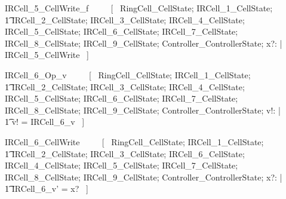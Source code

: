 \documentclass{article}
\begin{document}
\begin{zed}
IRCell\_5\_CellWrite\_f ~~~~ [~ 
    \Xi RingCell\_CellState; 
    \Xi IRCell\_1\_CellState; \\
    \t1 \Xi IRCell\_2\_CellState; 
    \Xi IRCell\_3\_CellState;
    \Xi IRCell\_4\_CellState; 
    \Xi IRCell\_5\_CellState; 
    \Xi IRCell\_6\_CellState; 
    \Xi IRCell\_7\_CellState; 
    \Xi IRCell\_8\_CellState; 
    \Xi IRCell\_9\_CellState; 
    \Xi Controller\_ControllerState; 
    x?: \nat | \\
    \lnot \pre IRCell\_5\_CellWrite ~] \\
\end{zed}
\begin{zed}
IRCell\_6\_Op\_v ~~~~ [~ 
    \Xi RingCell\_CellState; 
    \Xi IRCell\_1\_CellState; \\
    \t1 \Xi IRCell\_2\_CellState; 
    \Xi IRCell\_3\_CellState;
    \Xi IRCell\_4\_CellState; 
    \Xi IRCell\_5\_CellState; 
    \Xi IRCell\_6\_CellState; 
    \Xi IRCell\_7\_CellState; 
    \Xi IRCell\_8\_CellState; 
    \Xi IRCell\_9\_CellState; 
    \Xi Controller\_ControllerState; v!: \nat | \\
    \t1 v! = IRCell\_6\_v ~] \\
\end{zed}

\begin{zed}
IRCell\_6\_CellWrite ~~~~ [~ 
    \Xi RingCell\_CellState; 
    \Xi IRCell\_1\_CellState; \\
    \t1 \Xi IRCell\_2\_CellState; 
    \Xi IRCell\_3\_CellState; 
    \Delta IRCell\_6\_CellState;
    \Xi IRCell\_4\_CellState; 
    \Xi IRCell\_5\_CellState; 
    \Xi IRCell\_7\_CellState; 
    \Xi IRCell\_8\_CellState; 
    \Xi IRCell\_9\_CellState; 
    \Xi Controller\_ControllerState; 
    x?: \nat | \\
    \t1 IRCell\_6\_v' = x? ~] \\
\end{zed}
\end{document}
